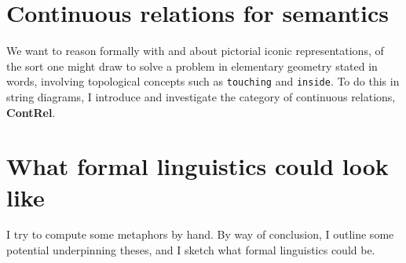 \chapter{Continuous relations for semantics}\label{chapter:contrel}
We want to reason formally with and about pictorial iconic representations, of the sort one might draw to solve a problem in elementary geometry stated in words, involving topological concepts such as \texttt{touching} and \texttt{inside}. To do this in string diagrams, I introduce and investigate the category of continuous relations, \textbf{ContRel}.
\newpage

\newpage

\newpage

\newpage

\newpage
\label{sec:topconcepts}
\newpage

\newpage


\newpage
\chapter{What formal linguistics could look like}
I try to compute some metaphors by hand. By way of conclusion, I outline some potential underpinning theses, and I sketch what formal linguistics could be.
\newpage
\label{sec:metaphor}








